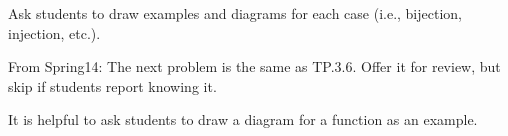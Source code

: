 \documentclass[handout]{mcs}
\begin{document}



\begin{staffnotes}
Ask students to draw examples and diagrams for each case (i.e., bijection, injection, etc.).

From Spring14: The next problem is the same as TP.3.6.  Offer it for
review, but skip if students report knowing it.
\end{staffnotes}


\begin{staffnotes}
It is helpful to ask students to draw a diagram for a function as an example.
\end{staffnotes}



\end{document}
